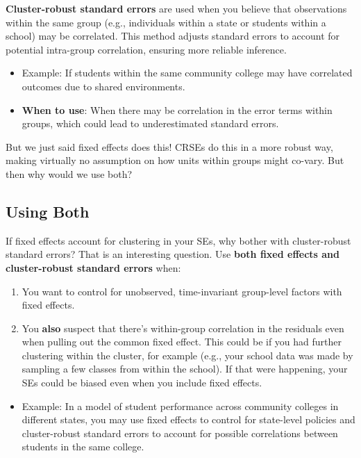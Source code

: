 \documentclass[
  letterpaper,
  DIV=11,
  numbers=noendperiod]{scrreprt}
\providecommand{\tightlist}{%
  \setlength{\itemsep}{0pt}\setlength{\parskip}{0pt}}\usepackage{longtable,booktabs,array}
\begin{document}
\textbf{Cluster-robust standard errors} are used when you believe that
observations within the same group (e.g., individuals within a state or
students within a school) may be correlated. This method adjusts
standard errors to account for potential intra-group correlation,
ensuring more reliable inference.

\begin{itemize}
\tightlist
\item
  Example: If students within the same community college may have
  correlated outcomes due to shared environments.
\item
  \textbf{When to use}: When there may be correlation in the error terms
  within groups, which could lead to underestimated standard errors.
\end{itemize}

But we just said fixed effects does this! CRSEs do this in a more robust
way, making virtually no assumption on how units within groups might
co-vary. But then why would we use both?

\subsection{Using Both}\label{using-both}

If fixed effects account for clustering in your SEs, why bother with
cluster-robust standard errors? That is an interesting question. Use
\textbf{both fixed effects and cluster-robust standard errors} when:

\begin{enumerate}
\def\labelenumi{\arabic{enumi}.}
\tightlist
\item
  You want to control for unobserved, time-invariant group-level factors
  with fixed effects.
\item
  You \textbf{also} suspect that there's within-group correlation in the
  residuals even when pulling out the common fixed effect. This could be
  if you had further clustering within the cluster, for example (e.g.,
  your school data was made by sampling a few classes from within the
  school). If that were happening, your SEs could be biased even when
  you include fixed effects.
\end{enumerate}

\begin{itemize}
\tightlist
\item
  Example: In a model of student performance across community colleges
  in different states, you may use fixed effects to control for
  state-level policies and cluster-robust standard errors to account for
  possible correlations between students in the same college.
\end{itemize}
\end{document}
